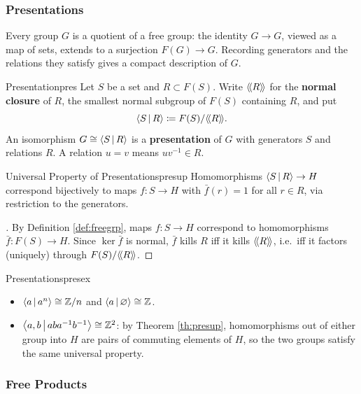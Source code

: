 \subsubsection{Presentations}

Every group $G$ is a quotient of a free group: the identity $G\to G$, viewed as a map of sets, extends to a surjection $F(G)\to G$. Recording generators and the relations they satisfy gives a compact description of $G$.

\begin{definition}{Presentation}{pres}
  Let $S$ be a set and $R\subset F(S)$. Write $\langle\!\langle R\rangle\!\rangle$ for the \textbf{normal closure} of $R$, the smallest normal subgroup of $F(S)$ containing $R$, and put
  \[
    \left\langle S\,\middle|\,R\right\rangle\coloneq F(S)/\langle\!\langle R\rangle\!\rangle.
  \]
  An isomorphism $G\cong\left\langle S\,\middle|\,R\right\rangle$ is a \textbf{presentation} of $G$ with generators $S$ and relations $R$. A relation $u=v$ means $uv^{-1}\in R$.
\end{definition}

\begin{proposition}{Universal Property of Presentations}{presup}
  Homomorphisms $\left\langle S\,\middle|\,R\right\rangle\to H$ correspond bijectively to maps $f:S\to H$ with $\bar f(r)=1$ for all $r\in R$, via restriction to the generators.
\end{proposition}

\begin{proof}[]
  By Definition \ref{def:freegrp}, maps $f:S\to H$ correspond to homomorphisms $\bar f:F(S)\to H$. Since $\ker\bar f$ is normal, $\bar f$ kills $R$ iff it kills $\langle\!\langle R\rangle\!\rangle$, i.e.\ iff it factors (uniquely) through $F(S)/\langle\!\langle R\rangle\!\rangle$.
\end{proof}

\begin{example}{Presentations}{presex}
  \begin{itemize}
    \item $\left\langle a\,\middle|\,a^n\right\rangle\cong\mathbb{Z}/n$ and $\left\langle a\,\middle|\,\varnothing\right\rangle\cong\mathbb{Z}$.
    \item $\left\langle a,b\,\middle|\,aba^{-1}b^{-1}\right\rangle\cong\mathbb{Z}^2$: by Theorem \ref{th:presup}, homomorphisms out of either group into $H$ are pairs of commuting elements of $H$, so the two groups satisfy the same universal property.
  \end{itemize}
\end{example}

\subsubsection{Free Products}

